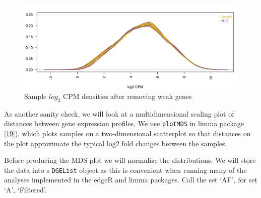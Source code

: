 \documentclass[
]{book}
\newenvironment{Shaded}{\begin{snugshade}}{\end{snugshade}}
\newcommand{\CommentTok}[1]{\textcolor[rgb]{0.56,0.35,0.01}{\textit{#1}}}
\newcommand{\DataTypeTok}[1]{\textcolor[rgb]{0.13,0.29,0.53}{#1}}
\newcommand{\KeywordTok}[1]{\textcolor[rgb]{0.13,0.29,0.53}{\textbf{#1}}}
\newcommand{\NormalTok}[1]{#1}
\newcommand{\OperatorTok}[1]{\textcolor[rgb]{0.81,0.36,0.00}{\textbf{#1}}}
\newcommand{\StringTok}[1]{\textcolor[rgb]{0.31,0.60,0.02}{#1}}
\begin{document}
\begin{figure}
\centering
\includegraphics{Static/figures/densityLcpm2-1.pdf}
\caption{\label{fig:densityLcpm2}Sample \(log_2\) CPM densities after removing weak genes}
\end{figure}

As another sanity check, we will look at a
multidimensional scaling plot of distances between gene expression
profiles. We use \texttt{plotMDS} in limma package {[}\protect\hyperlink{ref-Ritchie:2015aa}{19}{]}),
which plots samples on a two-dimensional scatterplot so that distances on
the plot approximate the typical log2 fold changes between the
samples.

Before producing the MDS plot we will normalize the distributions.
We will store the data into s \texttt{DGEList} object as this is convenient
when running many of the analyses implemented in the edgeR and limma packages.
Call the set `AF', for set `A', `Filtered'.

\begin{Shaded}
\end{Shaded}
\end{document}
